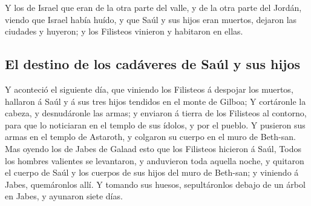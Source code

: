  Y los de Israel que eran de la otra parte del valle, y de
la otra parte del Jordán, viendo que Israel había huído, y que Saúl y
sus hijos eran muertos, dejaron las ciudades y huyeron; y los Filisteos
vinieron y habitaron en ellas.

\hypertarget{el-destino-de-los-caduxe1veres-de-sauxfal-y-sus-hijos}{%
\subsection{El destino de los cadáveres de Saúl y sus
hijos}\label{el-destino-de-los-caduxe1veres-de-sauxfal-y-sus-hijos}}

 Y aconteció el siguiente día, que viniendo los Filisteos
á despojar los muertos, hallaron á Saúl y á sus tres hijos tendidos en
el monte de Gilboa;  Y cortáronle la cabeza, y
desnudáronle las armas; y enviaron á tierra de los Filisteos al
contorno, para que lo noticiaran en el templo de sus ídolos, y por el
pueblo.  Y pusieron sus armas en el templo de Astaroth, y
colgaron su cuerpo en el muro de Beth-san.  Mas oyendo
los de Jabes de Galaad esto que los Filisteos hicieron á Saúl,
 Todos los hombres valientes se levantaron, y anduvieron
toda aquella noche, y quitaron el cuerpo de Saúl y los cuerpos de sus
hijos del muro de Beth-san; y viniendo á Jabes, quemáronlos allí.
 Y tomando sus huesos, sepultáronlos debajo de un árbol
en Jabes, y ayunaron siete días.
